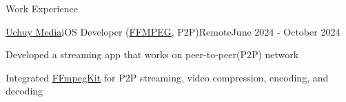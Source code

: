 \begin{resume_section}{Work Experience}
  


\begin{resume_employer}{\href{https://uchuymedia.uz}{Uchuy Media}}{iOS Developer (\href{https://github.com/arthenica/ffmpeg-kit}{FFMPEG}, P2P)}{Remote}{June 2024 - October 2024}
    \item Developed a streaming app that works on peer-to-peer(P2P) network
    \item Integrated \href{https://github.com/arthenica/ffmpeg-kit}{FFmpegKit} for P2P streaming, video compression, encoding, and decoding
 \end{resume_employer}


\end{resume_section}
